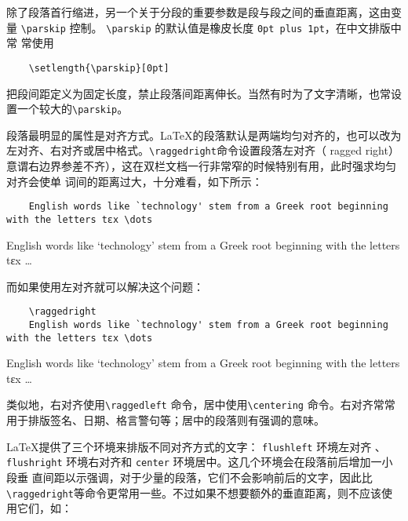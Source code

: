 除了段落首行缩进，另一个关于分段的重要参数是段与段之间的垂直距离，这由变量 \verb|\parskip| 控制。
\verb|\parskip| 的默认值是橡皮长度 \verb|0pt plus 1pt|，在中文排版中常
常使用
\begin{lstlisting}
    \setlength{\parskip}[0pt]
\end{lstlisting}
把段间距定义为固定长度，禁止段落间距离伸长。当然有时为了文字清晰，也常设置一个较大的\verb|\parskip|。

段落最明显的属性是对齐方式。\LaTeX 的段落默认是两端均匀对齐的，也可以改为左对齐、右对齐或居中格式。\verb|\raggedright|命令设置段落左对齐（ ragged right） 意谓右边界参差不齐），这在双栏文档一行非常窄的时候特别有用，此时强求均匀对齐会使单
词间的距离过大，十分难看，如下所示：

\begin{minipage}[t]{0.7\textwidth}
\begin{lstlisting}
    English words like `technology' stem from a Greek root beginning with the letters tεx \dots
\end{lstlisting}
\end{minipage}
\hfill
\begin{minipage}[t]{0.15\textwidth}
    English words like `technology' stem from a Greek root beginning with the letters tεx \dots
\end{minipage}

而如果使用左对齐就可以解决这个问题：

\begin{minipage}[t]{0.7\textwidth}
\begin{lstlisting}
    \raggedright
    English words like `technology' stem from a Greek root beginning with the letters tεx \dots
\end{lstlisting}
\end{minipage}
\hfill
\begin{minipage}[t]{0.15\textwidth}
    \raggedright
    English words like `technology' stem from a Greek root beginning with the letters tεx \dots
\end{minipage}

类似地，右对齐使用\verb|\raggedleft| 命令，居中使用\verb|\centering| 命令。右对齐常常用于排版签名、日期、格言警句等；居中的段落则有强调的意味。

\LaTeX 提供了三个环境来排版不同对齐方式的文字： \verb|flushleft| 环境左对齐 、 \verb|flushright| 环境右对齐和 \verb|center| 环境居中。这几个环境会在段落前后增加一小段垂
直间距以示强调，对于少量的段落，它们不会影响前后的文字，因此比\verb|\raggedright|等命令更常用一些。不过如果不想要额外的垂直距离，则不应该使用它们，如：

